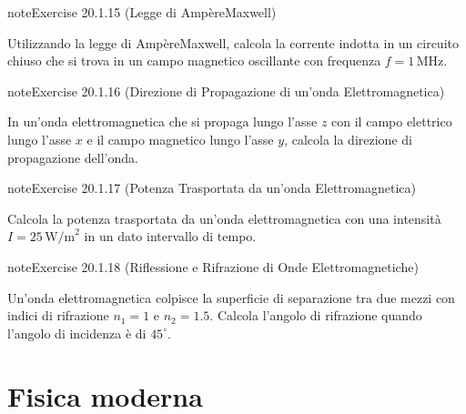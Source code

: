 \documentclass[letterpaper,10pt,italian]{jupyterBook}
\begin{document}
\begin{sphinxadmonition}{note}{Exercise 20.1.15 (Legge di Ampère\sphinxhyphen{}Maxwell)}



\sphinxAtStartPar
Utilizzando la legge di Ampère\sphinxhyphen{}Maxwell, calcola la corrente indotta in un circuito chiuso che si trova in un campo magnetico oscillante con frequenza \(f = 1 \, \text{MHz}\).
\end{sphinxadmonition}
 \label{exercise:ch/electromagnetism/em-waves-problems-exercise-15}

\begin{sphinxadmonition}{note}{Exercise 20.1.16 (Direzione di Propagazione di un’onda Elettromagnetica)}



\sphinxAtStartPar
In un’onda elettromagnetica che si propaga lungo l’asse \(z\) con il campo elettrico lungo l’asse \(x\) e il campo magnetico lungo l’asse \(y\), calcola la direzione di propagazione dell’onda.
\end{sphinxadmonition}
 \label{exercise:ch/electromagnetism/em-waves-problems-exercise-16}

\begin{sphinxadmonition}{note}{Exercise 20.1.17 (Potenza Trasportata da un’onda Elettromagnetica)}



\sphinxAtStartPar
Calcola la potenza trasportata da un’onda elettromagnetica con una intensità \(I = 25 \, \text{W/m}^2\) in un dato intervallo di tempo.
\end{sphinxadmonition}
 \label{exercise:ch/electromagnetism/em-waves-problems-exercise-17}

\begin{sphinxadmonition}{note}{Exercise 20.1.18 (Riflessione e Rifrazione di Onde Elettromagnetiche)}



\sphinxAtStartPar
Un’onda elettromagnetica colpisce la superficie di separazione tra due mezzi con indici di rifrazione \(n_1 = 1\) e \(n_2 = 1.5\). Calcola l’angolo di rifrazione quando l’angolo di incidenza è di \(45^\circ\).
\end{sphinxadmonition}

\sphinxstepscope


\part{Fisica moderna}
\end{document}
